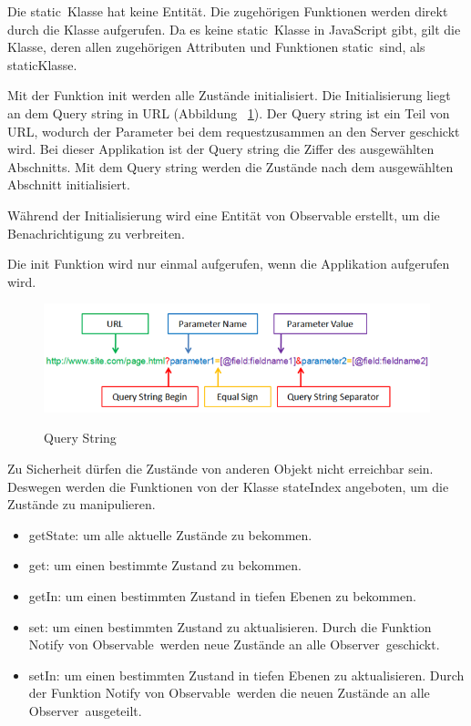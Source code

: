   Die \glqq static\grqq\ Klasse hat keine Entität. Die zugehörigen Funktionen werden direkt durch die Klasse aufgerufen. Da es keine \glqq static\grqq\ Klasse in JavaScript gibt, gilt die Klasse, deren allen zugehörigen Attributen und Funktionen \glqq static\grqq\ sind, als \glqq static\grqq Klasse.
  
  Mit der Funktion {\selectfont init}  werden alle Zustände initialisiert. Die Initialisierung liegt an dem Query string in URL (Abbildung ~\ref{fig:queryString}). Der Query string ist ein Teil von URL, wodurch der Parameter bei dem \glqq request\grqq zusammen an den Server geschickt wird. Bei dieser Applikation ist der Query string die Ziffer des ausgewählten Abschnitts. Mit dem Query string werden die Zustände nach dem ausgewählten Abschnitt initialisiert.
  
  Während der Initialisierung wird eine Entität von {\selectfont Observable} erstellt, um die Benachrichtigung zu verbreiten.
  
  Die {\selectfont init} Funktion wird nur einmal aufgerufen, wenn die Applikation aufgerufen wird.
  
\begin{figure}[ht]
\centering
\caption[Query String]{Query String}
\includegraphics[width=\textwidth]{images/queryString.png}
\label{fig:queryString} 
\end{figure}
  
  Zu Sicherheit dürfen die Zustände von anderen Objekt nicht erreichbar sein. Deswegen werden die Funktionen von der Klasse {\selectfont stateIndex} angeboten, um die Zustände zu manipulieren.
  
  \begin{itemize}
      \item {\selectfont getState}: um alle aktuelle Zustände zu bekommen.
      \item {\selectfont get}: um einen bestimmte Zustand zu bekommen.
      \item {\selectfont getIn}: um einen bestimmten Zustand in tiefen Ebenen zu bekommen.
      \item {\selectfont set}: um einen bestimmten Zustand zu aktualisieren. Durch die Funktion {\selectfont Notify} von \glqq Observable\grqq\ werden neue Zustände an alle \glqq Observer\grqq\ geschickt.
      \item {\selectfont setIn}: um einen bestimmten Zustand in tiefen Ebenen zu aktualisieren. Durch der Funktion {\selectfont Notify} von \glqq Observable\grqq\ werden die neuen Zustände an alle \glqq Observer\grqq\ ausgeteilt.
  \end{itemize}
  
